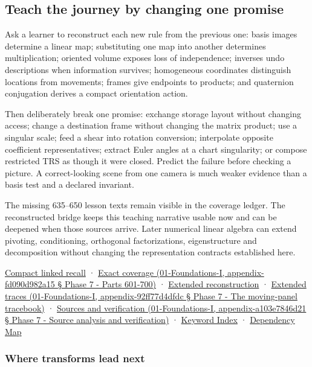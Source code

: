 \subsection{Teach the journey by changing one promise}\label{teach-the-journey-by-changing-one-promise}

Ask a learner to reconstruct each new rule from the previous one: basis images determine a linear map; substituting one map into another determines multiplication; oriented volume exposes loss of independence; inverses undo descriptions when information survives; homogeneous coordinates distinguish locations from movements; frames give endpoints to products; and quaternion conjugation derives a compact orientation action.

Then deliberately break one promise: exchange storage layout without changing access; change a destination frame without changing the matrix product; use a singular scale; feed a shear into rotation conversion; interpolate opposite coefficient representatives; extract Euler angles at a chart singularity; or compose restricted TRS as though it were closed. Predict the failure before checking a picture. A correct-looking scene from one camera is much weaker evidence than a basis test and a declared invariant.

The missing 635--650 lesson texts remain visible in the coverage ledger. The reconstructed bridge keeps this teaching narrative usable now and can be deepened when those sources arrive. Later numerical linear algebra can extend pivoting, conditioning, orthogonal factorizations, eigenstructure and decomposition without changing the representation contracts established here.

\hyperref[appendix-68f22c734be3]{Compact linked recall} · \href{}{Exact coverage (01-Foundations-I, appendix-fd090d982a15 § Phase 7 - Parts 601-700)} · \hyperref[02-foundations-ii-ch039]{Extended reconstruction} · \href{}{Extended traces (01-Foundations-I, appendix-92ff77d4dfdc § Phase 7 - The moving-panel tracebook)} · \href{}{Sources and verification (01-Foundations-I, appendix-a103e7846d21 § Phase 7 - Source analysis and verification)} · \hyperref[appendix-a6d556a4ef50]{Keyword Index} · \hyperref[appendix-4ad47bdd269a]{Dependency Map}

\subsubsection{Where transforms lead next}\label{where-transforms-lead-next}

